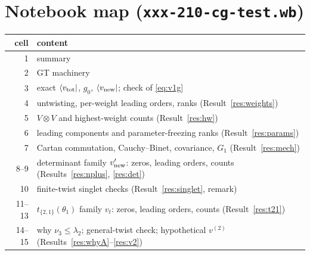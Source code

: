 \documentclass[11pt]{article}
\newcommand{\nb}[1]{\texttt{#1}}
\theoremstyle{definition}
\theoremstyle{remark}
\begin{document}
\section*{Notebook map (\nb{xxx-210-cg-test.wb})}
\begin{center}
\begin{tabular}{rl}\toprule
cell & content\\\midrule
1 & summary\\
2 & GT machinery\\
3 & exact $\langle v_{\rm tot}|$, $g_0$, $\langle v_{\rm new}|$; check of \eqref{eq:v1g}\\
4 & untwisting, per-weight leading orders, ranks (Result~\ref{res:weights})\\
5 & $V\otimes V$ and highest-weight counts (Result~\ref{res:hw})\\
6 & leading components and parameter-freezing ranks (Result~\ref{res:params})\\
7 & Cartan commutation, Cauchy--Binet, covariance, $G_1$ (Result~\ref{res:mech})\\
8--9 & determinant family $v'_{\rm new}$: zeros, leading orders, counts (Results~\ref{res:nplus}, \ref{res:det})\\
10 & finite-twist singlet checks (Result~\ref{res:singlet}, remark)\\
11--13 & $t_{\{2,1\}}(\theta_1)$ family $v_t$: zeros, leading orders, counts (Result~\ref{res:t21})\\
14--15 & why $\nu_3\le\lambda_2$; general-twist check; hypothetical $v^{(2)}$ (Results~\ref{res:whyA}--\ref{res:v2})\\\bottomrule
\end{tabular}
\end{center}
\end{document}
